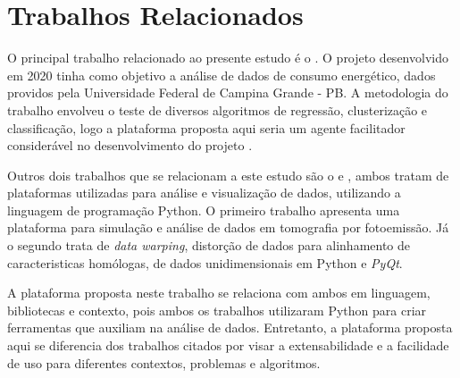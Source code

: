 \section{Trabalhos Relacionados}
    \label{sec:trabalhos-relacionados}

    O principal trabalho relacionado ao presente estudo é o \cite{SmartEnergy}. O projeto desenvolvido em 2020 tinha como objetivo a análise de dados de consumo energético, dados providos pela Universidade Federal de Campina Grande - PB. A metodologia do trabalho envolveu o teste de diversos algoritmos de regressão, clusterização e classificação, logo a plataforma proposta aqui seria um agente facilitador considerável no desenvolvimento do projeto \cite{SmartEnergy}.

    Outros dois trabalhos que se relacionam a este estudo são o \cite{brandstetter2021kmap} e \cite{pataky2019mwarp1d}, ambos tratam de plataformas utilizadas para análise e visualização de dados, utilizando a linguagem de programação Python. O primeiro trabalho apresenta uma plataforma para simulação e análise de dados em tomografia por fotoemissão. Já o segundo trata de \textit{data warping}, distorção de dados para alinhamento de caracteristicas homólogas, de dados unidimensionais em Python e \textit{PyQt}.

    A plataforma proposta neste trabalho se relaciona com ambos em linguagem, bibliotecas e contexto, pois ambos os trabalhos utilizaram Python para criar ferramentas que auxiliam na análise de dados. Entretanto, a plataforma proposta aqui se diferencia dos trabalhos citados por visar a extensabilidade e a facilidade de uso para diferentes contextos, problemas e algoritmos.

